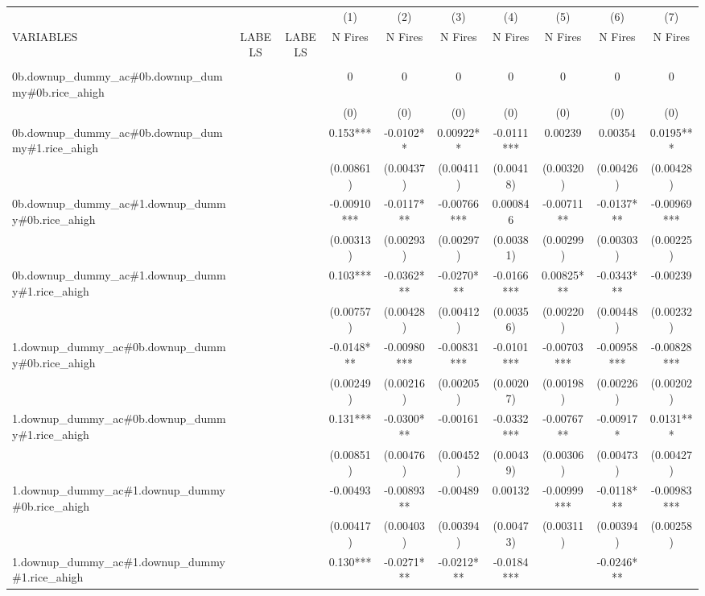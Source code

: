 \documentclass[]{article}
\begin{document}
\begin{tabular}{lccccccccc} \hline
 &  &  & (1) & (2) & (3) & (4) & (5) & (6) & (7) \\
VARIABLES & LABELS & LABELS & N Fires & N Fires & N Fires & N Fires & N Fires & N Fires & N Fires \\ \hline
 &  &  &  &  &  &  &  &  &  \\
0b.downup\_dummy\_ac\#0b.downup\_dummy\#0b.rice\_ahigh &  &  & 0 & 0 & 0 & 0 & 0 & 0 & 0 \\
 &  &  & (0) & (0) & (0) & (0) & (0) & (0) & (0) \\
0b.downup\_dummy\_ac\#0b.downup\_dummy\#1.rice\_ahigh &  &  & 0.153*** & -0.0102** & 0.00922** & -0.0111*** & 0.00239 & 0.00354 & 0.0195*** \\
 &  &  & (0.00861) & (0.00437) & (0.00411) & (0.00418) & (0.00320) & (0.00426) & (0.00428) \\
0b.downup\_dummy\_ac\#1.downup\_dummy\#0b.rice\_ahigh &  &  & -0.00910*** & -0.0117*** & -0.00766*** & 0.000846 & -0.00711** & -0.0137*** & -0.00969*** \\
 &  &  & (0.00313) & (0.00293) & (0.00297) & (0.00381) & (0.00299) & (0.00303) & (0.00225) \\
0b.downup\_dummy\_ac\#1.downup\_dummy\#1.rice\_ahigh &  &  & 0.103*** & -0.0362*** & -0.0270*** & -0.0166*** & 0.00825*** & -0.0343*** & -0.00239 \\
 &  &  & (0.00757) & (0.00428) & (0.00412) & (0.00356) & (0.00220) & (0.00448) & (0.00232) \\
1.downup\_dummy\_ac\#0b.downup\_dummy\#0b.rice\_ahigh &  &  & -0.0148*** & -0.00980*** & -0.00831*** & -0.0101*** & -0.00703*** & -0.00958*** & -0.00828*** \\
 &  &  & (0.00249) & (0.00216) & (0.00205) & (0.00207) & (0.00198) & (0.00226) & (0.00202) \\
1.downup\_dummy\_ac\#0b.downup\_dummy\#1.rice\_ahigh &  &  & 0.131*** & -0.0300*** & -0.00161 & -0.0332*** & -0.00767** & -0.00917* & 0.0131*** \\
 &  &  & (0.00851) & (0.00476) & (0.00452) & (0.00439) & (0.00306) & (0.00473) & (0.00427) \\
1.downup\_dummy\_ac\#1.downup\_dummy\#0b.rice\_ahigh &  &  & -0.00493 & -0.00893** & -0.00489 & 0.00132 & -0.00999*** & -0.0118*** & -0.00983*** \\
 &  &  & (0.00417) & (0.00403) & (0.00394) & (0.00473) & (0.00311) & (0.00394) & (0.00258) \\
1.downup\_dummy\_ac\#1.downup\_dummy\#1.rice\_ahigh &  &  & 0.130*** & -0.0271*** & -0.0212*** & -0.0184*** &  & -0.0246*** &  \\

\end{tabular}
\end{document}
